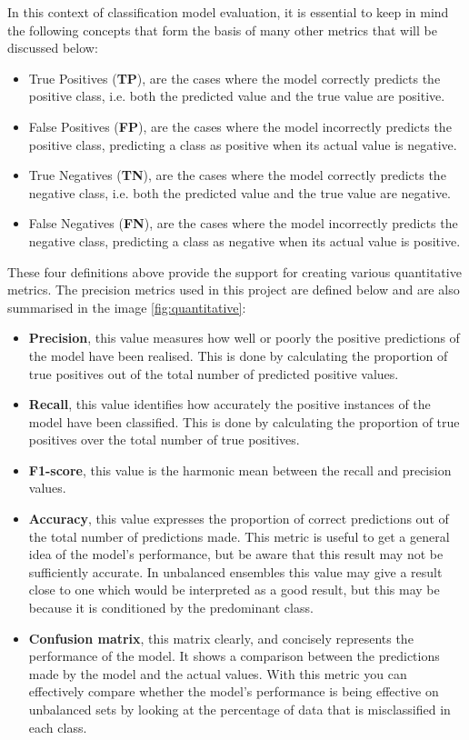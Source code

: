 In this context of classification model evaluation, it is essential to keep in mind the following concepts that form the basis of many other metrics that will be discussed below: 
\begin{itemize}
    \item True Positives (\textbf{TP}), are the cases where the model correctly predicts the positive class, i.e. both the predicted value and the true value are positive. 
    \item False Positives (\textbf{FP}), are the cases where the model incorrectly predicts the positive class, predicting a class as positive when its actual value is negative. 
    \item True Negatives (\textbf{TN}), are the cases where the model correctly predicts the negative class, i.e. both the predicted value and the true value are negative. 
    \item False Negatives (\textbf{FN}), are the cases where the model incorrectly predicts the negative class, predicting a class as negative when its actual value is positive.
\end{itemize}

These four definitions above provide the support for creating various quantitative metrics. 
The precision metrics used in this project are defined below and are also summarised in the image \ref{fig:quantitative}: 
\begin{itemize}
    \item \textbf{Precision}, this value measures how well or poorly the positive predictions of the model have been realised. This is done by calculating the proportion of true positives out of the total number of predicted positive values.
    \item \textbf{Recall}, this value identifies how accurately the positive instances of the model have been classified. This is done by calculating the proportion of true positives over the total number of true positives.
    \item \textbf{F1-score}, this value is the harmonic mean between the recall and precision values. 
    \item \textbf{Accuracy}, this value expresses the proportion of correct predictions out of the total number of predictions made. This metric is useful to get a general idea of the model's performance, but be aware that this result may not be sufficiently accurate. In unbalanced ensembles this value may give a result close to one which would be interpreted as a good result, but this may be because it is conditioned by the predominant class. 
    \item \textbf{Confusion matrix}, this matrix clearly, and concisely represents the performance of the model. It shows a comparison between the predictions made by the model and the actual values. With this metric you can effectively compare whether the model's performance is being effective on unbalanced sets by looking at the percentage of data that is misclassified in each class. 
\end{itemize}

